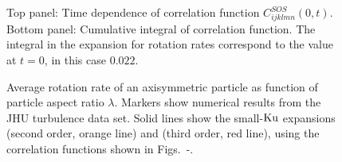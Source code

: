 \documentclass[thesis.tex]{subfiles}
\begin{document}
\begin{figure}
	\begin{center}
\end{center}
\caption{ Top panel: Time dependence of correlation function $C^{SOS}_{ijklmn}(0,t)$. Bottom panel: Cumulative integral of correlation function. The integral in the expansion for rotation rates  correspond to the value at $t=0$, in this case $0.022$.}%
\end{figure}
\begin{figure}
	\begin{center}
\end{center}
\caption{Average rotation rate of an axisymmetric particle as function of particle aspect ratio $\lambda$. Markers show numerical results from the JHU turbulence data set. Solid lines show the small-$\mbox{Ku}$ expansions  (second order, orange line) and  (third order, red line), using the correlation functions shown in Figs.~-.}%
\end{figure}
\end{document}
